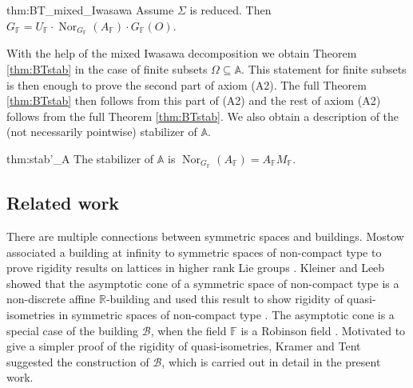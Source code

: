 \documentclass[12pt]{amsart}
\newcommand{\F}{\mathbb{F} }
\newcommand{\R}{\mathbb{R} }
\newcommand{\A}{\mathbb{A}}
\newcommand{\B}{\mathcal{B}}
\numberwithin{equation}{section}
\theoremstyle{remark} %
\begin{document}
\begin{reptheorem}{thm:BT_mixed_Iwasawa}
	Assume $\Sigma$ is reduced. Then $G_\F = U_\F \cdot \operatorname{Nor}_{G_\F}(A_\F) \cdot G_\F(O)$.
\end{reptheorem}

With the help of the mixed Iwasawa decomposition we obtain Theorem \ref{thm:BTstab} in the case of finite subsets $\Omega \subseteq \A$. This statement for finite subsets is then enough to prove the second part of axiom (A2). The full Theorem \ref{thm:BTstab} then follows from this part of (A2) and the rest of axiom (A2) follows from the full Theorem \ref{thm:BTstab}. We also obtain a description of the (not necessarily pointwise) stabilizer of $\A$.
\begin{repproposition}{thm:stab'_A}
	The stabilizer of $\A$ is $\operatorname{Nor}_{G_\F}(A_\F) = A_\F M_\F$.
\end{repproposition}



\subsection{Related work}

There are multiple connections between symmetric spaces and buildings. Mostow associated a building at infinity to symmetric spaces of non-compact type to prove rigidity results on lattices in higher rank Lie groups \cite{Mos73}. Kleiner and Leeb showed that the asymptotic cone of a symmetric space of non-compact type is a non-discrete affine $\R$-building and used this result to show rigidity of quasi-isometries in symmetric spaces of non-compact type \cite{KlLe}. The asymptotic cone is a special case of the building $\B$, when the field $\F$ is a Robinson field \cite[Theorem 1.11]{BIPP23arxiv}. Motivated to give a simpler proof of the rigidity of quasi-isometries, Kramer and Tent \cite{KrTe} suggested the construction of $\B$, which is carried out in detail in the present work. 
\end{document}
